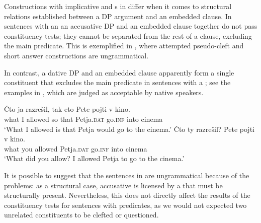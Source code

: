 \documentclass[output=paper,colorlinks,citecolor=brown,newtxmath]{langsci/langscibook}
\begin{document}
\noindent Constructions with implicative and s in  differ when it comes to structural relations established between a DP argument and an embedded clause. In sentences with an  an accusative DP and an embedded clause together do not pass constituency tests; they cannot be separated from the rest of a clause, excluding the main predicate. This is exemplified in , where attempted pseudo-cleft and short answer constructions are ungrammatical.

\begin{exe}
\ex\label{ex5} \begin{xlist}
    \end{xlist}
\end{exe}

\noindent In contrast, a dative DP and an embedded clause apparently form a single constituent that excludes the main predicate in sentences with a ; see the examples in , which are judged as acceptable by native speakers.

\begin{exe}
\ex\label{ex6} \begin{xlist}
\ex\label{ex6a}
\gll Čto ja razrešil, tak eto Pete pojti v kino.\\
    what I allowed so that Petja.\textsc{dat} go.\textsc{inf} into cinema\\
\glt `What I allowed is that Petja would go to the cinema.'
\ex\label{ex6b}
\gll Čto ty razrešil? Pete pojti v kino.\\
    what you allowed Petja.\textsc{dat} go.\textsc{inf} into cinema\\
\glt `What did you allow? I allowed Petja to go to the cinema.'
    \end{xlist}
\end{exe}

\noindent It is possible to suggest that the sentences in  are ungrammatical because of the  problems: as a structural case, accusative is licensed by a  that must be structurally present. Nevertheless, this does not directly affect the results of the constituency tests for sentences with  predicates, as we would not expected two unrelated constituents to be clefted or questioned. \par
\end{document}
